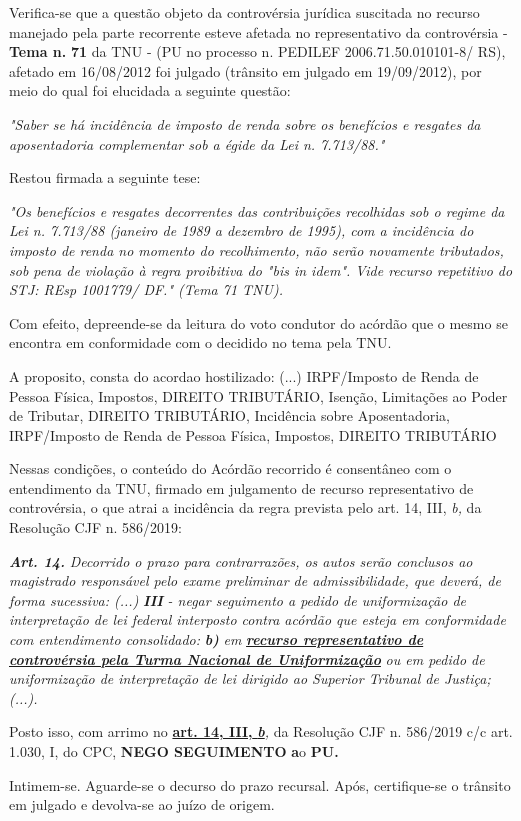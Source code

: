 \documentclass[12pt]{article}
\begin{document}
\justifying
\noindent Verifica-se que a questão objeto da controvérsia jurídica suscitada no recurso manejado pela parte recorrente esteve afetada no representativo da controvérsia - \textbf{Tema n. }\textbf{71} da TNU - (PU no processo n. PEDILEF 2006.71.50.010101-8/ RS),  afetado em 16/08/2012 foi julgado (trânsito em julgado em 19/09/2012), por meio do qual foi elucidada a seguinte questão:

\noindent \textit{"Saber se há incidência de imposto de renda sobre os benefícios e resgates da aposentadoria complementar sob a égide da Lei n. 7.713/88."}

\noindent Restou firmada a seguinte tese:

\noindent \textit{"Os benefícios e resgates decorrentes das contribuições recolhidas sob o regime da Lei n. 7.713/88 (janeiro de 1989 a dezembro de 1995), com a incidência do imposto de renda no momento do recolhimento, não serão novamente tributados, sob pena de violação à regra proibitiva do "bis in idem". Vide recurso repetitivo do STJ: REsp 1001779/ DF." (Tema 71 TNU).}

\noindent Com efeito, depreende-se da leitura do voto condutor do acórdão que o mesmo se encontra em conformidade com o decidido no  tema pela TNU.

\noindent A proposito, consta do acordao hostilizado: (...) IRPF/Imposto de Renda de Pessoa Física, Impostos, DIREITO TRIBUTÁRIO, Isenção, Limitações ao Poder de Tributar, DIREITO TRIBUTÁRIO, Incidência sobre Aposentadoria, IRPF/Imposto de Renda de Pessoa Física, Impostos, DIREITO TRIBUTÁRIO

\noindent Nessas condições, o conteúdo do Acórdão recorrido é consentâneo com o entendimento da TNU, firmado em julgamento de recurso representativo de controvérsia, o que atrai a incidência da regra prevista pelo art. 14, III, \textit{b,} da Resolução CJF n. 586/2019:

\noindent \textit{\textbf{Art. 14.}}\textit{ Decorrido o prazo para contrarrazões, os autos serão conclusos ao magistrado responsável pelo exame preliminar de admissibilidade, que deverá, de forma sucessiva: (...) }\textit{\textbf{III }}\textit{- negar seguimento a pedido de uniformização de interpretação de lei federal interposto contra acórdão que esteja em conformidade com entendimento consolidado: }\textit{\textbf{b)}}\textit{ em }\uline{\textit{\textbf{recurso representativo de controvérsia pela Turma Nacional de Uniformização}}}\textit{ ou em pedido de uniformização de interpretação de lei dirigido ao Superior Tribunal de Justiça;(...).}

\noindent Posto isso, com arrimo no \uline{\textbf{art. 14, III, }}\uline{\textit{\textbf{b}}}\textit{,} da Resolução CJF n. 586/2019 c/c art. 1.030, I, do CPC, \textbf{NEGO SEGUIMENTO }\textbf{a}o\textbf{ PU}\textbf{.}

\noindent Intimem-se. Aguarde-se o decurso do prazo recursal. Após, certifique-se o trânsito em julgado e devolva-se ao juízo de origem.
\end{document}
